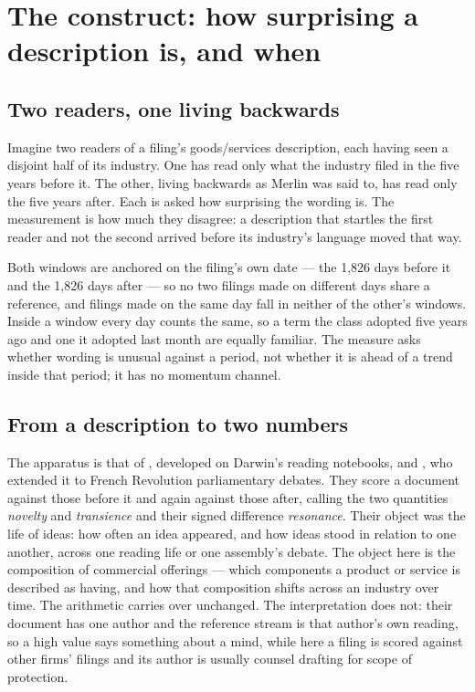 
\section{The construct: how surprising a description is, and when}\label{sec:construct}

\subsection{Two readers, one living backwards}

Imagine two readers of a filing's goods/services description, each having seen
a disjoint half of its industry. One has read only what the industry filed in
the five years before it. The other, living backwards as Merlin was said to,
has read only the five years after. Each is asked how surprising the wording
is. The measurement is how much they disagree: a description that startles the
first reader and not the second arrived before its industry's language moved
that way.

Both windows are anchored on the filing's own date --- the 1,826 days before
it and the 1,826 days after --- so no two filings made on different days share
a reference, and filings made on the same day fall in neither of the other's
windows. Inside a window every day counts the same, so a term the class
adopted five years ago and one it adopted last month are equally familiar. The
measure asks whether wording is unusual against a period, not whether it is
ahead of a trend inside that period; it has no momentum channel.

\subsection{From a description to two numbers}\label{sec:definitions}

The apparatus is that of \citet{Murdock2017}, developed on Darwin's reading
notebooks, and \citet{Barron2018}, who extended it to French Revolution
parliamentary debates. They score a document against those before it and again
against those after, calling the two quantities \emph{novelty} and
\emph{transience} and their signed difference \emph{resonance}. Their object
was the life of ideas: how often an idea appeared, and how ideas stood in
relation to one another, across one reading life or one assembly's debate. The
object here is the composition of commercial offerings --- which components a
product or service is described as having, and how that composition shifts
across an industry over time. The arithmetic carries over unchanged. The
interpretation does not: their document has one author and the reference
stream is that author's own reading, so a high value says something about a
mind, while here a filing is scored against other firms' filings and its
author is usually counsel drafting for scope of protection.


